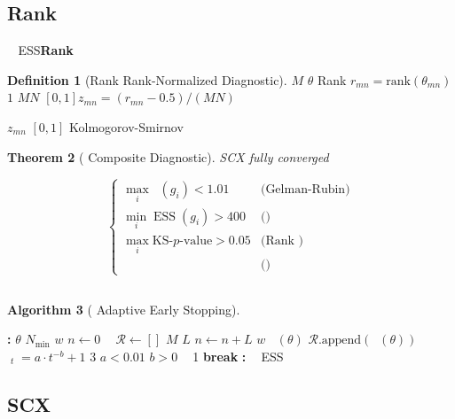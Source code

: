 \documentclass[12pt,a4paper]{article}
\theoremstyle{plain}
\newtheorem{theorem}{ Theorem}[section]
\theoremstyle{definition}
\newtheorem{definition}[theorem]{ Definition}
\newtheorem{algorithm-env}[theorem]{ Algorithm}
\DeclareMathOperator{\ESS}{ESS}
\DeclareMathOperator{\Rhat}{\hat{R}}
\begin{document}
\subsection{Rank }

 $\Rhat$  ESS\textbf{Rank }

\begin{definition}[Rank  Rank-Normalized Diagnostic]
 $M$  $\theta$  Rank 
$r_{mn} = \text{rank}(\theta_{mn})$ $1$  $MN$
$[0,1]$$z_{mn} = (r_{mn} - 0.5) / (MN)$

$z_{mn}$  $[0,1]$ 
 Kolmogorov-Smirnov 
\end{definition}

\begin{theorem}[ Composite Diagnostic]
 SCX \textbf{}fully converged

\begin{equation}\label{eq:composite_diag}
    \begin{cases}
        \max_i \Rhat(g_i) < 1.01 & \text{(Gelman-Rubin)} \\[4pt]
        \min_i \ESS(g_i) > 400 & \text{()} \\[4pt]
        \max_i \text{KS-}p\text{-value} > 0.05 & \text{(Rank )} \\[4pt]
        \text{} & \text{()}
    \end{cases}
\end{equation}


\end{theorem}

\subsection{}

\begin{algorithm-env}[ Adaptive Early Stopping]
\begin{algorithmic}[1]
\State \textbf{:}  $\theta$ $N_{\min}$ $w$
\State $n \leftarrow 0$ $\Rhat$  $\mathcal{R} \leftarrow []$
    \State  $M$  $L$ 
    \State $n \leftarrow n + L$
    \State  $w$  $\Rhat(\theta)$
    \State $\mathcal{R}.\text{append}(\Rhat(\theta))$
        \State  $\Rhat_t = a \cdot t^{-b} + 1$  3 
        \State  $a < 0.01$  $b > 0$ $\Rhat$  1
            \textbf{break}
    \EndIf
\EndWhile
\State \textbf{:} $\Rhat$ ESS
\end{algorithmic}
\end{algorithm-env}

\subsection{SCX }
\end{document}
